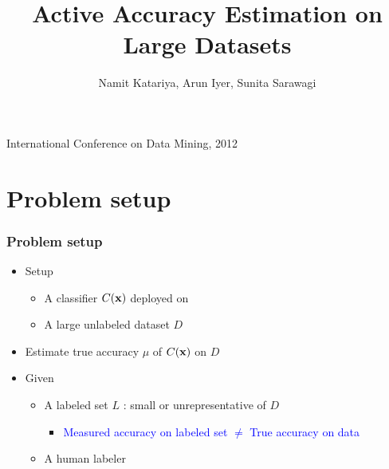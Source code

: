 \documentclass[usenames,dvipsnames, 11pt]{beamer}
\title[{\makebox[.45\paperwidth]{Active Evaluation of Classifiers\hfill%
       \insertframenumber/\inserttotalframenumber}}]{Active Accuracy Estimation on Large Datasets}
\author {Namit Katariya, Arun Iyer, Sunita Sarawagi}
\institute{IIT Bombay}
\newcommand{\vek}[1]{{\bf {#1}}}
\newcommand{\vx}{{\vek{x}}}
\newlength{\wideitemsep}
\let\olditem\item
\renewcommand{\item}{\setlength{\itemsep}{\wideitemsep}\olditem}
\begin{document}
\begin{frame}
\titlepage
\begin{center}
\large{International Conference on Data Mining, 2012} \\ \vspace*{10pt}
\end{center}
\end{frame}






\section{Problem setup}
\begin{frame}
\frametitle{Problem setup}
\pause
\begin{itemize}
\item Setup
  \begin{itemize}
  \item A classifier $C(\vx)$ deployed on
  \item A large unlabeled dataset $D$
  \end{itemize}
  \pause
\item Estimate true accuracy $\mu$ of $C(\vx)$ on $D$
\pause
\item Given
  \begin{itemize}
\item A labeled set $L$ :  small or unrepresentative of $D$ 
\begin{itemize}
\item \textcolor{blue}{Measured accuracy on labeled set $\neq$ True accuracy on data}
\end{itemize}
\item A human labeler
\end{itemize}
\end{itemize}
\end{frame}
\end{document}
